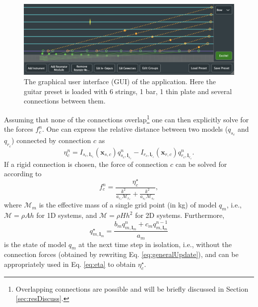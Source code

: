 \documentclass{article}
\begin{document}
\begin{figure}[t] %
    \centering
    \includegraphics[width = \textwidth]{GUI.png}
    \caption{The graphical user interface (GUI) of the application. Here the guitar preset is loaded with 6 strings, 1 bar, 1 thin plate and several connections between them.}
    \label{fig:gui}
\end{figure}
Assuming that none of the connections overlap\footnote{Overlapping connections are possible \cite{Bilbao2009Modular} and will be briefly discussed in Section \ref{sec:resDiscuss}.} one can then explicitly solve for the forces $f_c^n$. One can express the relative distance between two models ($q_{s_c}$ and $q_{r_c}$) connected by connection $c$ as
\begin{equation}\label{eq:eta}
    \eta_c^n =  I_{s_c,\boldsymbol{l}_{s_c}}(\boldsymbol{x}_{s,c})q_{s_c, \boldsymbol{l}_{s_c}}^n - I_{r_c,\boldsymbol{l}_{r_c}}(\boldsymbol{x}_{r,c})q_{r_c, \boldsymbol{l}_{r_c}}^n.
\end{equation}
If a rigid connection is chosen, the force of connection $c$ can be solved for according to
\begin{equation}\label{eq:rigidConnDisc}
    f_c^n = \frac{\eta^\star_c}{ \frac{k^2}{a_{r_c}\mathcal{M}_{r_c}} + \frac{k^2}{a_{s_c}\mathcal{M}_{s_c}}},
\end{equation}
where $\mathcal{M}_m$ is the effective mass of a single grid point (in kg) of model $q_m$, i.e., $\mathcal{M} = \rho A h$ for 1D systems, and $\mathcal{M} = \rho H h^2$ for 2D systems. Furthermore, 
\begin{equation}
    q_{m,\boldsymbol{l}_m}^\star = \frac{b_m q_{m,\boldsymbol{l}_m}^n + c_m q_{m,\boldsymbol{l}_m}^{n-1}}{a_m}
\end{equation}
is the state of model $q_m$ at the next time step in isolation,  i.e., without the connection forces (obtained by rewriting Eq. \eqref{eq:generalUpdate}), and can be appropriately used in Eq. \eqref{eq:eta} to obtain $\eta_c^\star$.
\end{document}
